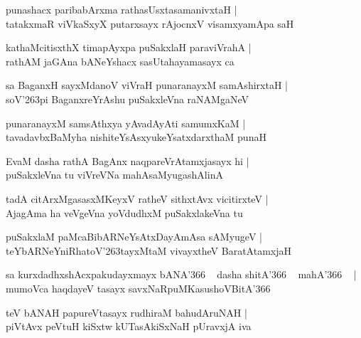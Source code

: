 \documentclass[twoside,12pt,openright]{book}
\def\S{\char'263}
\newcounter{shloka}[chapter]
\begin{document}
\begin{shloka}%
punashacx paribabArxma rathasUsxtasamanivxtaH |\\
tatakxmaR viVkaSxyX putarxsayx rAjocnxV visamxyamApa saH 
\end{shloka}

\begin{shloka}%
kathaMcitisxthX timapAyxpa puSakxlaH paraviVrahA |\\
rathAM jaGAna bANeYshacx sasUtahayamasayx ca 
\end{shloka}

\begin{shloka}%
sa BaganxH sayxMdanoV viVraH punaranayxM samAshirxtaH |\\
soV\S pi BaganxreYrAshu puSakxleVna raNAMgaNeV
\end{shloka}

\begin{shloka}%
punaranayxM samsAthxya yAvadAyAti samumxKaM |\\
tavadavbxBaMyha nishiteYsAsxyukeYsatxdarxthaM punaH 
\end{shloka}

\begin{shloka}%
EvaM dasha rathA BagAnx naqpareVrAtamxjasayx hi |\\
puSakxleVna tu viVreVNa mahAsaMyugashAlinA 
\end{shloka}

\begin{shloka}%
tadA citArxMgasasxMKeyxV ratheV sithxtAvx vicitirxteV |\\
AjagAma ha veVgeVna yoVdudhxM puSakxlakeVna tu
\end{shloka}

\begin{shloka}%
puSakxlaM paMcaBibARNeYsAtxDayAmAsa sAMyugeV |\\
teYbARNeYniRhatoV\S tayxMtaM vivayxtheV BaratAtamxjaH 
\end{shloka}

\begin{shloka}%
sa kurxdadhxshAcxpakudayxmayx bANA\char'366 ~ dasha shitA\char'366 ~ mahA\char'366 ~ |\\
mumoVca haqdayeV tasayx savxNaRpuMKasushoVBitA\char'366
\end{shloka}

\begin{shloka}%
teV bANAH  papureVtasayx rudhiraM bahudAruNAH |\\
piVtAvx peVtuH kiSxtw kUTasAkiSxNaH pUravxjA iva 
\end{shloka}
\end{document}
